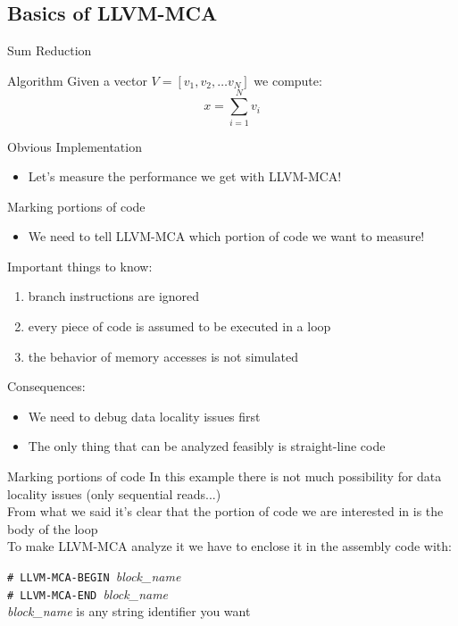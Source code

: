 
\subsection{Basics of LLVM-MCA}


\begin{frame}{Sum Reduction}
\begin{block}{Algorithm}
Given a vector $V = [v_1, v_2, \ldots v_N]$ we compute:\\
\[
x = \sum_{i=1}^{N}{v_i}
\]
\end{block}
\begin{block}{Obvious Implementation}
\end{block}
\begin{itemize}
\item Let's measure the performance we get with LLVM-MCA!
\end{itemize}
\end{frame}


\begin{frame}{Marking portions of code}
\begin{itemize}
\item We need to tell LLVM-MCA which portion of code we want to measure!
\end{itemize}
\bigskip
Important things to know:
\begin{enumerate}
\item branch instructions are ignored
\item every piece of code is assumed to be executed in a loop
\item the behavior of memory accesses is not simulated
\end{enumerate}
\bigskip
Consequences:
\begin{itemize}
\item We need to debug data locality issues \alert{first}
\item The only thing that can be analyzed feasibly is straight-line code
\end{itemize}
\end{frame}


\begin{frame}{Marking portions of code}
In this example there is not much possibility for data locality
issues (only sequential reads...)\\
\bigskip
From what we said it's clear that the portion of code we are interested
in is the \alert{body of the loop}\\
\medskip
To make LLVM-MCA analyze it we have to enclose it \alert{in the assembly code}
with:\\
\smallskip
\begin{center}
\large
\texttt{\# LLVM-MCA-BEGIN }\textit{block\_name}\\
\smallskip
\texttt{\# LLVM-MCA-END }\textit{block\_name}\\
\medskip
{\footnotesize \textit{block\_name} is any string identifier you want}
\end{center}
\end{frame}


